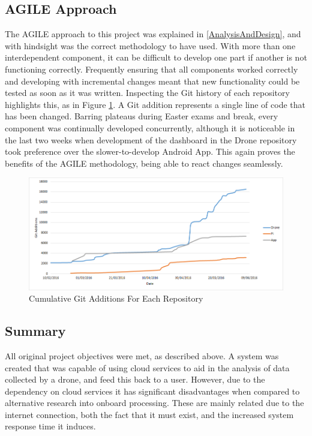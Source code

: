 \documentclass{article}
\begin{document}
\subsection{AGILE Approach}
The AGILE approach to this project was explained in \ref{AnalysisAndDesign}, and with hindsight was the correct methodology to have used. With more than one interdependent component, it can be difficult to develop one part if another is not functioning correctly. Frequently ensuring that all components worked correctly and developing with incremental changes meant that new functionality could be tested as soon as it was written. Inspecting the Git history of each repository highlights this, as in Figure \ref{fig:GitAnalysis}. A Git addition represents a single line of code that has been changed. Barring plateaus during Easter exams and break, every component was continually developed concurrently, although it is noticeable in the last two weeks when development of the dashboard in the Drone repository took preference over the slower-to-develop Android App. This again proves the benefits of the AGILE methodology, being able to react changes seamlessly.

\begin{figure}[h]
\centering
\caption{Cumulative Git Additions For Each Repository\label{fig:GitAnalysis}}
\includegraphics[width=\textwidth]{GitAnalysis}
\end{figure}

\subsection{Summary}
All original project objectives were met, as described above. A system was created that was capable of using cloud services to aid in the analysis of data collected by a drone, and feed this back to a user. However, due to the dependency on cloud services it has significant disadvantages when compared to alternative research into onboard processing. These are mainly related due to the internet connection, both the fact that it must exist, and the increased system response time it induces. 
\end{document}
